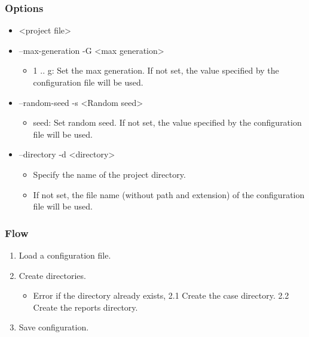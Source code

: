 \documentclass[]{article}
\begin{document}
\subsubsection{Options}\label{options-1}

\begin{itemize}
\itemsep1pt\parskip0pt
\item
  \textless{}project file\textgreater{}
\item
  --max-generation -G \textless{}max generation\textgreater{}

  \begin{itemize}
  \itemsep1pt\parskip0pt
  \item
    1 .. g: Set the max generation. If not set, the value specified by
    the configuration file will be used.
  \end{itemize}
\item
  --random-seed -s \textless{}Random seed\textgreater{}

  \begin{itemize}
  \itemsep1pt\parskip0pt
  \item
    seed: Set random seed. If not set, the value specified by the
    configuration file will be used.
  \end{itemize}
\item
  --directory -d \textless{}directory\textgreater{}

  \begin{itemize}
  \itemsep1pt\parskip0pt
  \item
    Specify the name of the project directory.
  \item
    If not set, the file name (without path and extension) of the
    configuration file will be used.
  \end{itemize}
\end{itemize}

\subsubsection{Flow}\label{flow-1}

\begin{enumerate}
\def\labelenumi{\arabic{enumi}.}
\itemsep1pt\parskip0pt
\item
  Load a configuration file.
\item
  Create directories.

  \begin{itemize}
  \itemsep1pt\parskip0pt
  \item
    Error if the directory already exists, 2.1 Create the case
    directory. 2.2 Create the reports directory.
  \end{itemize}
\item
  Save configuration.
\end{enumerate}
\end{document}
